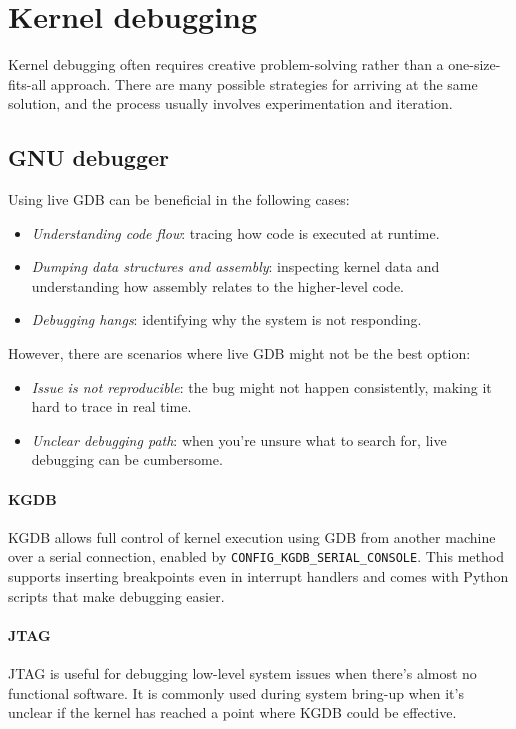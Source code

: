 \section{Kernel debugging}

Kernel debugging often requires creative problem-solving rather than a one-size-fits-all approach. 
There are many possible strategies for arriving at the same solution, and the process usually involves experimentation and iteration.

\subsection{GNU debugger}
Using live GDB can be beneficial in the following cases:
\begin{itemize}
    \item \textit{Understanding code flow}: tracing how code is executed at runtime.
    \item \textit{Dumping data structures and assembly}: inspecting kernel data and understanding how assembly relates to the higher-level code.
    \item \textit{Debugging hangs}: identifying why the system is not responding.
\end{itemize}
However, there are scenarios where live GDB might not be the best option:
\begin{itemize}
    \item \textit{Issue is not reproducible}: the bug might not happen consistently, making it hard to trace in real time.
    \item \textit{Unclear debugging path}: when you're unsure what to search for, live debugging can be cumbersome.
\end{itemize}

\paragraph*{KGDB}
KGDB allows full control of kernel execution using GDB from another machine over a serial connection, enabled by \texttt{CONFIG\_KGDB\_SERIAL\_CONSOLE}.
This method supports inserting breakpoints even in interrupt handlers and comes with Python scripts that make debugging easier.

\paragraph*{JTAG}
JTAG is useful for debugging low-level system issues when there's almost no functional software. 
It is commonly used during system bring-up when it's unclear if the kernel has reached a point where KGDB could be effective.

